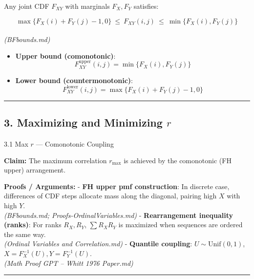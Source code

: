 \documentclass[
  letterpaper,
  DIV=11,
  numbers=noendperiod]{scrartcl}
\makeatletter
\let\oldparagraph\paragraph
\renewcommand{\paragraph}{
    \@ifstar
      \xxxParagraphStar
      \xxxParagraphNoStar
  }
\newcommand{\xxxParagraphStar}[1]{\oldparagraph*{#1}\mbox{}}
\newcommand{\xxxParagraphNoStar}[1]{\oldparagraph{#1}\mbox{}}
\providecommand{\tightlist}{%
  \setlength{\itemsep}{0pt}\setlength{\parskip}{0pt}}
\theoremstyle{remark}
\makeatother
\begin{document}
Any joint CDF \(F_{XY}\) with marginals \(F_X, F_Y\) satisfies:

\[
\max\{F_X(i) + F_Y(j) - 1, 0\} \ \le \ F_{XY}(i,j) \ \le \ \min\{F_X(i), F_Y(j)\}
\]\\
\emph{(BFbounds.md)}

\begin{itemize}
\tightlist
\item
  \textbf{Upper bound (comonotonic)}: \[
  F^{\text{upper}}_{XY}(i,j) = \min\{F_X(i), F_Y(j)\}
  \]
\item
  \textbf{Lower bound (countermonotonic)}: \[
  F^{\text{lower}}_{XY}(i,j) = \max\{F_X(i) + F_Y(j) - 1, 0\}
  \]
\end{itemize}

\begin{center}\rule{0.5\linewidth}{0.5pt}\end{center}

\subsection{\texorpdfstring{3. Maximizing and Minimizing
\(r\)}{3. Maximizing and Minimizing r}}\label{maximizing-and-minimizing-r}

\paragraph{\texorpdfstring{3.1 Max \(r\) --- Comonotonic
Coupling}{3.1 Max r --- Comonotonic Coupling}}\label{max-r-comonotonic-coupling}

\textbf{Claim:} The maximum correlation \(r_{\max}\) is achieved by the
comonotonic (FH upper) arrangement.

\textbf{Proofs / Arguments:} - \textbf{FH upper pmf construction}: In
discrete case, differences of CDF steps allocate mass along the
diagonal, pairing high \(X\) with high \(Y\).\\
\emph{(BFbounds.md; Proofs-OrdinalVariables.md)} - \textbf{Rearrangement
inequality (ranks)}: For ranks \(R_X, R_Y\), \(\sum R_X R_Y\) is
maximized when sequences are ordered the same way.\\
\emph{(Ordinal Variables and Correlation.md)} - \textbf{Quantile
coupling}: \(U \sim \mathrm{Unif}(0,1)\),
\(X = F_X^{-1}(U), Y = F_Y^{-1}(U)\).\\
\emph{(Math Proof GPT -- Whitt 1976 Paper.md)}

\begin{center}\rule{0.5\linewidth}{0.5pt}\end{center}
\end{document}
